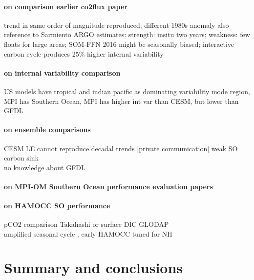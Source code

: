 \documentclass[12pt]{article}
\begin{document}
\paragraph{on comparison earlier co2flux paper} trend in same order of magnitude reproduced; different 1980s anomaly \citep{LeQuere2007,Lovenduski2007,landschuetzer2015} also reference to Sarmiento ARGO estimates: strength: insitu two years; weakness: few floats for large areas; SOM-FFN 2016 might be seasonally biased; interactive carbon cycle produces 25\% higher internal variability \citep{Ilyina2013}  

\paragraph{on internal variability comparison} US models have tropical and indian pacific as dominating variability mode region, MPI has Southern Ocean, MPI has higher int var than CESM, but lower than GFDL \citep{Resplandy2015}

\paragraph{on ensemble comparisons} CESM LE cannot reproduce decadal trends [private communication] weak SO carbon sink \citep{McKinley2016} \\ no knowledge about GFDL \citep{Rodgers2015} 

\paragraph{on MPI-OM Southern Ocean performance evaluation papers}  \citep{Jungclaus2013,Sallee2013,Sallee2013a,Heuze2013,Stoessel2015} 

\paragraph{on HAMOCC SO performance} pCO2 comparison Takahashi or surface DIC GLODAP \citep{Ilyina2013} %
\\ amplified seasonal cycle \citep{Nevison2016}, early HAMOCC tuned for NH \citep{Six1996} %




\clearpage

\section{Summary and conclusions}
\end{document}
